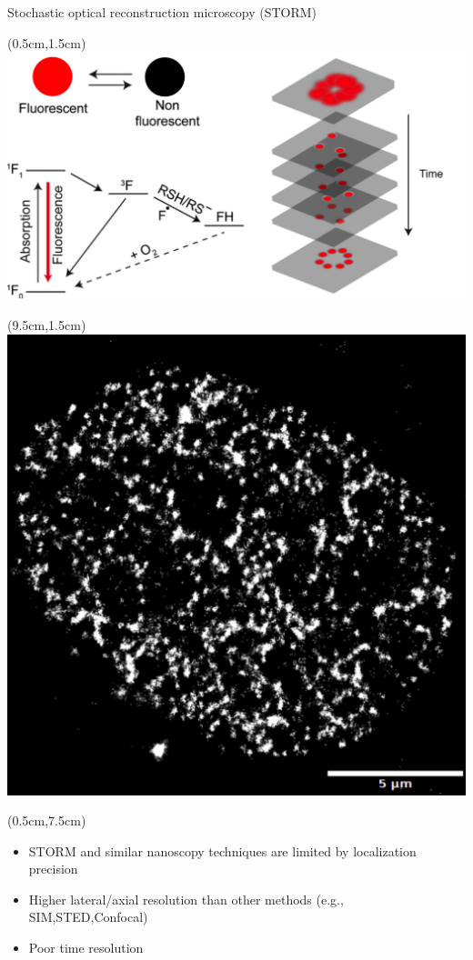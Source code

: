 \documentclass{beamer}					%
\begin{document}
\begin{frame}{Stochastic optical reconstruction microscopy (STORM)}
\begin{textblock*}{9cm}(0.5cm,1.5cm)
\includegraphics[width=\textwidth]{../../phd/dissertation/dissertation/media/Intro-Cropped.png}
\end{textblock*}
\begin{textblock*}{5cm}(9.5cm,1.5cm)
\includegraphics[width=\textwidth]{../../phd/dissertation/dissertation/media/STORM-Example.png}
\end{textblock*}
\begin{textblock*}{15cm}(0.5cm,7.5cm)
\begin{itemize}
\item STORM and similar nanoscopy techniques are limited by localization precision
\item Higher lateral/axial resolution than other methods (e.g., SIM,STED,Confocal)
\item Poor time resolution
\end{itemize}
\end{textblock*}
\end{frame}
\end{document}
